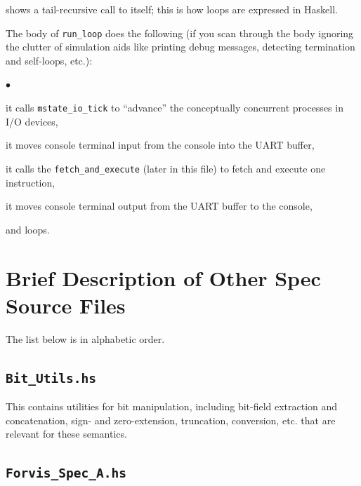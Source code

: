 \documentclass[11pt]{article}
\newenvironment{tightlist}%
{\begin{list}{$\bullet$}{%
    \setlength{\topsep}{0in}
    \setlength{\partopsep}{0in}
    \setlength{\itemsep}{0in}
    \setlength{\parsep}{0in}
    \setlength{\leftmargin}{1.5em}
    \setlength{\rightmargin}{0in}
    \setlength{\itemindent}{0in}
}
}%
{\end{list}
}
\begin{document}


shows a tail-recursive call to itself; this is how loops are expressed in Haskell.

The body of \verb|run_loop| does the following (if you scan through
the body ignoring the clutter of simulation aids like printing debug
messages, detecting termination and self-loops, etc.):

\begin{tightlist}

\item it calls \verb|mstate_io_tick| to ``advance'' the conceptually
concurrent processes in I/O devices,

\item it moves console terminal input from the console into the UART
      buffer,

\item it calls the \verb|fetch_and_execute| (later in this file) to
      fetch and execute one instruction,

\item it moves console terminal output from the UART buffer to the
      console,

\item and loops.

\end{tightlist}



\section{Brief Description of Other Spec Source Files}

The list below is in alphabetic order.


\subsection{\tt Bit\_Utils.hs}

This contains utilities for bit manipulation, including bit-field
extraction and concatenation, sign- and zero-extension, truncation,
conversion, etc. that are relevant for these semantics.


\subsection{\tt Forvis\_Spec\_A.hs}
\end{document}
